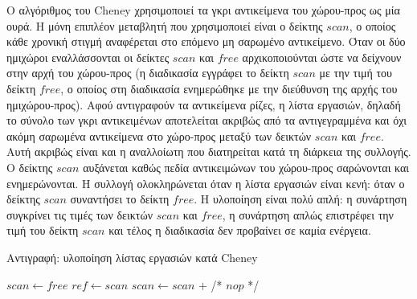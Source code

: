 \begin{greek}
Ο αλγόριθμος του Cheney \cite{DBLP:journals/cacm/Cheney70} χρησιμοποιεί
τα γκρι αντικείμενα του χώρου-προς ως μία ουρά. Η μόνη επιπλέον
μεταβλητή που χρησιμοποιεί είναι ο δείκτης $scan$, ο οποίος κάθε
χρονική στιγμή αναφέρεται στο επόμενο μη σαρωμένο αντικείμενο.
Όταν οι δύο ημιχώροι εναλλάσσονται οι δείκτες $scan$ και $free$
αρχικοποιούνται ώστε να δείχνουν στην αρχή του χώρου-προς (η
διαδικασία  εγγράφει το δείκτη $scan$ με
την τιμή του δείκτη $free$, ο οποίος στη διαδικασία 
ενημερώθηκε με την διεύθυνση της αρχής του ημιχώρου-προς).
Αφού αντιγραφούν τα αντικείμενα ρίζες, η λίστα εργασιών, δηλαδή
το σύνολο των γκρι αντικειμένων αποτελείται ακριβώς από τα
αντιγεγραμμένα και όχι ακόμη σαρωμένα αντικείμενα στο χώρο-προς
μεταξύ των δεικτών $scan$ και $free$. Αυτή ακριβώς είναι και η
αναλλοίωτη που διατηρείται κατά τη διάρκεια της συλλογής. Ο
δείκτης $scan$ αυξάνεται καθώς πεδία αντικειμώνων του χώρου-προς
σαρώνονται και ενημερώνονται. Η συλλογή ολοκληρώνεται όταν η
λίστα εργασιών είναι κενή: όταν ο δείκτης $scan$ συναντήσει το
δείκτη $free$. Η υλοποίηση είναι πολύ απλή: η συνάρτηση 
συγκρίνει τις τιμές των δεικτών $scan$ και $free$, η συνάρτηση
 απλώς επιστρέφει την τιμή του δείκτη $scan$
και τέλος η διαδικασία  δεν προβαίνει σε καμία
ενέργεια.

\begin{algorithm}[H]
  \caption{Αντιγραφή: υλοποίηση λίστας εργασιών κατά Cheney}
  \label{alg:c_3}
  \begin{algorithmic}[1]
      \State $scan \gets free$
    \EndProcedure
    \Statex
      \State {}
    \EndFunction
    \Statex
      \State $ref \gets scan$
      \State $scan \gets scan$ $+$ 
      \State {}
    \EndFunction
    \Statex
      \State /* $nop$ */
    \EndProcedure
  \end{algorithmic}
\end{algorithm}


\end{greek}
